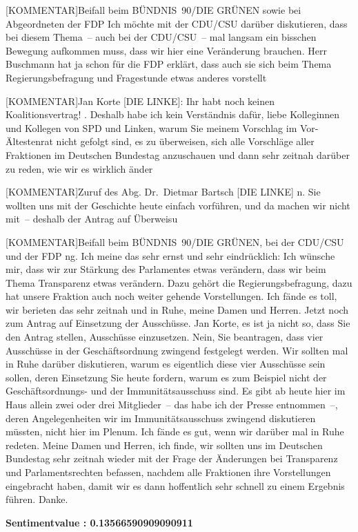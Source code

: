 \documentclass[a4paper,11pt]{article}
\begin{document}
[KOMMENTAR]Beifall beim BÜNDNIS 90/DIE GRÜNEN sowie bei Abgeordneten der FDP
 Ich möchte mit der CDU/CSU darüber diskutieren, dass bei diesem Thema – auch bei der CDU/CSU – mal langsam ein bisschen Bewegung aufkommen muss, dass wir hier eine Veränderung brauchen. Herr Buschmann hat ja schon für die FDP erklärt, dass auch sie sich beim Thema Regierungsbefragung und Fragestunde etwas anderes vorstellt

[KOMMENTAR]Jan Korte [DIE LINKE]: Ihr habt noch keinen Koalitionsvertrag!
. Deshalb habe ich kein Verständnis dafür, liebe Kolleginnen und Kollegen von SPD und Linken, warum Sie meinem Vorschlag im Vor-Ältestenrat nicht gefolgt sind, es zu überweisen, sich alle Vorschläge aller Fraktionen im Deutschen Bundestag anzuschauen und dann sehr zeitnah darüber zu reden, wie wir es wirklich änder

[KOMMENTAR]Zuruf des Abg. Dr. Dietmar Bartsch [DIE LINKE]
n. Sie wollten uns mit der Geschichte heute einfach vorführen, und da machen wir nicht mit – deshalb der Antrag auf Überweisu

[KOMMENTAR]Beifall beim BÜNDNIS 90/DIE GRÜNEN, bei der CDU/CSU und der FDP
ng. Ich meine das sehr ernst und sehr eindrücklich: Ich wünsche mir, dass wir zur Stärkung des Parlamentes etwas verändern, dass wir beim Thema Transparenz etwas verändern. Dazu gehört die Regierungsbefragung, dazu hat unsere Fraktion auch noch weiter gehende Vorstellungen. Ich fände es toll, wir berieten das sehr zeitnah und in Ruhe, meine Damen und Herren. Jetzt noch zum Antrag auf Einsetzung der Ausschüsse. Jan Korte, es ist ja nicht so, dass Sie den Antrag stellen, Ausschüsse einzusetzen. Nein, Sie beantragen, dass vier Ausschüsse in der Geschäftsordnung zwingend festgelegt werden. Wir sollten mal in Ruhe darüber diskutieren, warum es eigentlich diese vier Ausschüsse sein sollen, deren Einsetzung Sie heute fordern, warum es zum Beispiel nicht der Geschäftsordnungs- und der Immunitätsausschuss sind. Es gibt ab heute hier im Haus allein zwei oder drei Mitglieder – das habe ich der Presse entnommen –, deren Angelegenheiten wir im Immunitätsausschuss zwingend diskutieren müssten, nicht hier im Plenum. Ich fände es gut, wenn wir darüber mal in Ruhe redeten. Meine Damen und Herren, ich finde, wir sollten uns im Deutschen Bundestag sehr zeitnah wieder mit der Frage der Änderungen bei Transparenz und Parlamentsrechten befassen, nachdem alle Fraktionen ihre Vorstellungen eingebracht haben, damit wir es dann hoffentlich sehr schnell zu einem Ergebnis führen. Danke.

\textbf{Sentimentvalue : 0.13566590909090911}
\end{document}
